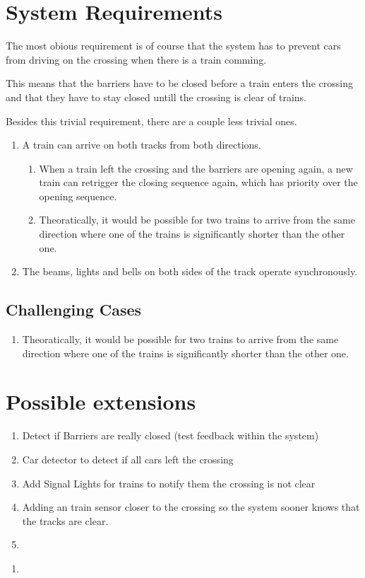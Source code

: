 \documentclass[final]{scrreprt} %
\begin{document}
\section{System Requirements}
The most obious requirement is of course that the system has to prevent cars from driving on the crossing when there is a train comming.

This means that the barriers have to be closed before a train enters the crossing and that they have to stay closed untill the crossing is clear of trains.

Besides this trivial requirement, there are a couple less trivial ones.
\begin{enumerate}
\item A train can arrive on both tracks from both directions.
	\begin{enumerate}
	\item When a train left the crossing and the barriers are opening again, a new train can retrigger the closing sequence again, which has priority over the opening sequence. %
	\item Theoratically, it would be possible for two trains to arrive from the same direction where one of the trains is significantly shorter than the other one. %
	\end{enumerate}

\item The beams, lights and bells on both sides of the track operate synchronously.
\end{enumerate}







\subsection{Challenging Cases}
	\begin{enumerate}
		\item Theoratically, it would be possible for two trains to arrive from the same direction where one of the trains is significantly shorter than the other one.

	\end{enumerate}

\section{Possible extensions}
\begin{enumerate}
\item Detect if Barriers are really closed (test feedback within the system)
\item Car detector to detect if all cars left the crossing
\item Add Signal Lights for trains to notify them the crossing is not clear
\item Adding an train sensor closer to the crossing so the system sooner knows that the tracks are clear.
\item 
\end{enumerate}



\begin{enumerate}
\item 
\end{enumerate}
\end{document}
